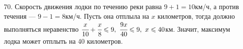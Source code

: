 70. Скорость движения лодки по течению реки равна $9+1=10$км/ч, а против течения --- $9-1=8$км/ч. Пусть она отплыла на $x$ километров, тогда должно выполняться неравенство $\cfrac{x}{10}+\cfrac{x}{8}\leqslant9,\ \cfrac{9x}{40}\leqslant9,\ x\leqslant40$км. Значит, максимум лодка может отплыть на 40 километров.\\
